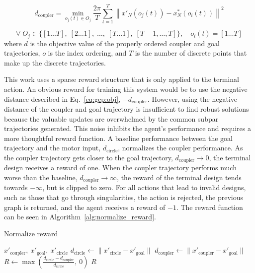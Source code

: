 \begin{equation}\label{eq:gcp:obj}
d_{\text{coupler}} = \min_{o_j(t) \in O_j} \frac{2\pi}{T} \sum_{t=1}^{T} \left\| x'_N(o_j(t)) - x^*_N(o_i(t)) \right\|^2
\end{equation}

\[
\forall \; O_j \in \{[1 \ldots T],\; [2 \ldots 1],\; \ldots,\; [T \ldots 1],\; [T{-}1,\ldots, T] \},
\quad o_i(t) = [1 \ldots T]
\]
where $d$ is the objective value of the properly ordered coupler and goal trajectories, $o$ is the index ordering, and $T$ is the number of discrete points that make up the discrete trajectories.

This work uses a sparse reward structure that is only applied to the terminal action. An obvious reward for training this system would be to use the negative distance described in Eq.~\eqref{eq:gcp:obj}, \( -d_{\text{coupler}} \). However, using the negative distance of the coupler and goal trajectory is insufficient to find robust solutions because the valuable updates are overwhelmed by the common subpar trajectories generated. This noise inhibits the agent’s performance and requires a more thoughtful reward function. A baseline performance between the goal trajectory and the motor input, \( d_{\text{circle}} \), normalizes the coupler performance. As the coupler trajectory gets closer to the goal trajectory, \( d_{\text{coupler}} \rightarrow 0 \), the terminal design receives a reward of one. When the coupler trajectory performs much worse than the baseline, \( d_{\text{coupler}} \rightarrow \infty \), the reward of the terminal design tends towards \( -\infty \), but is clipped to zero. For all actions that lead to invalid designs, such as those that go through singularities, the action is rejected, the previous graph is returned, and the agent receives a reward of \( -1 \). The reward function can be seen in Algorithm~\ref{alg:normalize_reward}.

\begin{algorithm}[H]
\caption{Normalize reward}
\label{alg:normalize_reward}
\begin{algorithmic}[1]
\Require $x'_{\text{coupler}},\ x'_{\text{goal}},\ x'_{\text{circle}}$ 
\State $d_{\text{circle}} \gets \|x'_{\text{circle}} - x'_{\text{goal}}\|$ 
\State $d_{\text{coupler}} \gets \|x'_{\text{coupler}} - x'_{\text{goal}}\|$ 
\State $R \gets \max\left( \frac{d_{\text{circle}} - d_{\text{coupler}}}{d_{\text{circle}}},\ 0 \right)$ 
\State \Return $R$
\end{algorithmic}
\end{algorithm}

